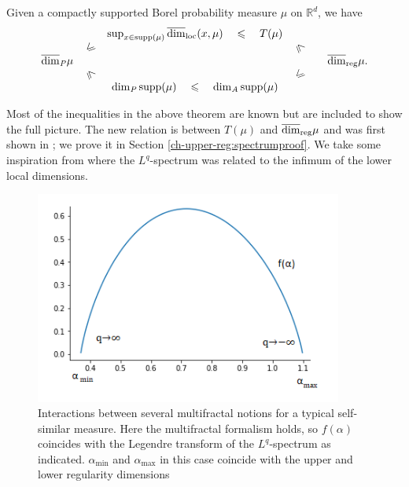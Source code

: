 \begin{theorem} \label{ch-upper-reg:relationships}
	Given a compactly supported Borel probability measure $\mu$ on $\mathbb{R}^d$, we have
	\[
	\begin{array}{ccccccccccc}
	&&                  \sup_ {x\in \mathrm{supp}(\mu)}  \overline{\dim}_{\mathrm{loc}}(x,\mu)   \quad  \leq    \quad   T(\mu)                        & & &    \\
	&                       \rotatebox[origin=c]{45}{$\leq$}          & &              \rotatebox[origin=c]{315}{$\leq$} & &   \\
	\overline{\dim}_\text{\emph{P}} \mu                                            & &        &&                  & \r.\\
	&                \rotatebox[origin=c]{315}{$\leq$}              &&           \rotatebox[origin=c]{45}{$\leq$} & &  \\
	&&                                            \dim_\text{\emph{P}} \mathrm{supp}(\mu)      \quad  \leq   \quad  \dim_\text{\emph{A}} \mathrm{supp}(\mu)                           & & &  
	\end{array}
	\]
\end{theorem}

Most of the inequalities in the above theorem are known but are included to show the full picture. The new relation is between $T(\mu)$ and $\overline{\dim}_{\textup{reg}} \mu$ and was first shown in \cite{fraser-howroyd2}; we prove it in Section \ref{ch-upper-reg:spectrumproof}. We take some inspiration from \cite{fraser-jordan} where the $L^q$-spectrum was related to the infimum of the lower local dimensions.


\begin{figure}[h]
	\centering
	\includegraphics[width=0.9\textwidth]{pics/ch-upper-reg/multifractal.png}
	\caption{Interactions between several multifractal notions for a typical self-similar measure. Here the multifractal formalism holds, so $f(\alpha)$ coincides with the Legendre transform of the $L^q$-spectrum as indicated. $\alpha_{\min}$ and $\alpha_{\max}$ in this case coincide with the upper and lower regularity dimensions}
	\label{fig:multifractal}
\end{figure}


